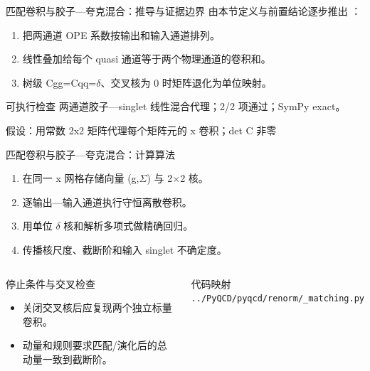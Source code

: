 \begin{frame}[t]{匹配卷积与胶子—夸克混合：推导与证据边界}
\footnotesize
{}\quad 由本节定义与前置结论逐步推出 ：
\begin{enumerate}
\item 把两通道 OPE 系数按输出和输入通道排列。
\item 线性叠加给每个 quasi 通道等于两个物理通道的卷积和。
\item 树级 Cgg=Cqq=\ensuremath{\delta}、交叉核为 0 时矩阵退化为单位映射。
\end{enumerate}\begin{block}{可执行检查}
\quad 两通道胶子—singlet 线性混合代理；2/2 项通过；SymPy exact。
\par\scriptsize 假设：用常数 2x2 矩阵代理每个矩阵元的 x 卷积；det C 非零
\end{block}
\end{frame}

\begin{frame}[t]{匹配卷积与胶子—夸克混合：计算算法}
\footnotesize
{}\begin{enumerate}
\item 在同一 x 网格存储向量 (g,\ensuremath{\Sigma}) 与 2\ensuremath{\times}2 核。
\item 逐输出—输入通道执行守恒离散卷积。
\item 用单位 \ensuremath{\delta} 核和解析多项式做精确回归。
\item 传播核尺度、截断阶和输入 singlet 不确定度。
\end{enumerate}\begin{columns}[T,onlytextwidth]
\begin{block}{停止条件与交叉检查}\scriptsize\begin{itemize}
\item[\CheckMark] 关闭交叉核后应复现两个独立标量卷积。
\item[\CheckMark] 动量和规则要求匹配/\allowbreak{}演化后的总动量一致到截断阶。
\end{itemize}\end{block}
\begin{block}{代码映射}
\scriptsize \texttt{.\allowbreak{}.\allowbreak{}/\allowbreak{}PyQCD/\allowbreak{}pyqcd/\allowbreak{}renorm/\allowbreak{}\_\allowbreak{}matching.\allowbreak{}py}
\end{block}\end{columns}\end{frame}

